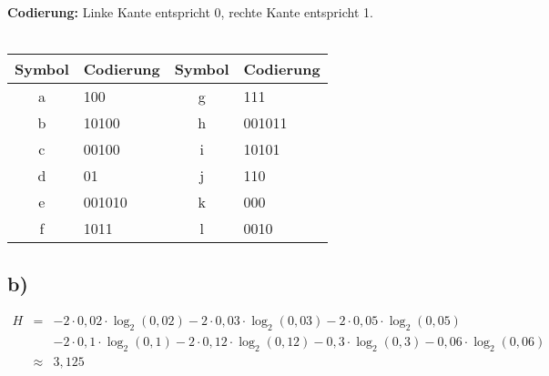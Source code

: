 \documentclass[a4paper]{scrartcl}
\begin{document}
\begin{figure}[!h]
		\end{figure}
                \textbf{Codierung:} Linke Kante entspricht 0, rechte Kante entspricht 1. \\ \\
               \begin{center}
	               \begin{tabular}{|c|l|c|l|}
	               		\hline
	               		Symbol & Codierung & Symbol &Codierung \\ \hline
	               		a & 100 & g & 111 \\
	               		b & 10100 & h & 001011 \\
	               		c & 00100 & i & 10101 \\
	               		d & 01 & j & 110 \\
	             		e & 001010 & k & 000 \\
	             		f & 1011 & l & 0010 \\ \hline
	               \end{tabular}
               \end{center}
               
                
	\subsection{b)}
		\(
		\begin{array}{lcl}
			H &=& -2 \cdot 0,02 \cdot \log_2(0,02) -2 \cdot 0,03 \cdot \log_2(0,03)-2\cdot 0,05 
			\cdot\log_2(0,05) \\ 
			&& -2 \cdot 0,1 \cdot \log_2(0,1) -2 \cdot 0,12 \cdot \log_2(0,12)-0,3\cdot\log_2(0,3)
			-0,06\cdot\log_2(0,06) \\
			&\approx & 3,125
		\end{array}
		\)
\end{document}
